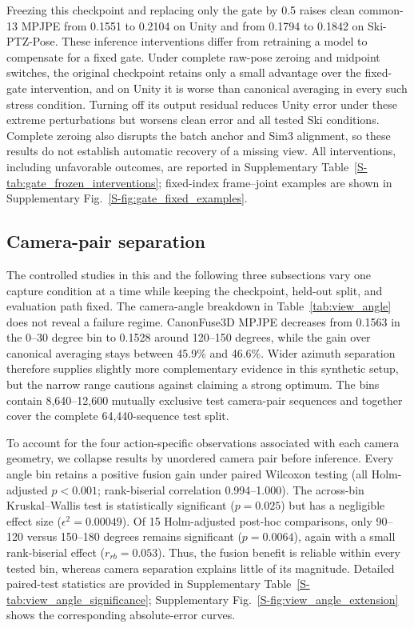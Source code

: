 \documentclass[preprint,12pt]{elsarticle}
\begin{document}
Freezing this checkpoint and replacing only the gate by 0.5 raises clean common-13 MPJPE from 0.1551 to 0.2104 on Unity and from 0.1794 to 0.1842 on Ski-PTZ-Pose. These inference interventions differ from retraining a model to compensate for a fixed gate. Under complete raw-pose zeroing and midpoint switches, the original checkpoint retains only a small advantage over the fixed-gate intervention, and on Unity it is worse than canonical averaging in every such stress condition. Turning off its output residual reduces Unity error under these extreme perturbations but worsens clean error and all tested Ski conditions. Complete zeroing also disrupts the batch anchor and Sim3 alignment, so these results do not establish automatic recovery of a missing view. All interventions, including unfavorable outcomes, are reported in Supplementary Table~\ref{S-tab:gate_frozen_interventions}; fixed-index frame--joint examples are shown in Supplementary Fig.~\ref{S-fig:gate_fixed_examples}.

\FloatBarrier
\subsection{Camera-pair separation}

The controlled studies in this and the following three subsections vary one capture condition at a time while keeping the checkpoint, held-out split, and evaluation path fixed. The camera-angle breakdown in Table~\ref{tab:view_angle} does not reveal a failure regime. CanonFuse3D MPJPE decreases from 0.1563 in the 0--30 degree bin to 0.1528 around 120--150 degrees, while the gain over canonical averaging stays between 45.9\% and 46.6\%. Wider azimuth separation therefore supplies slightly more complementary evidence in this synthetic setup, but the narrow range cautions against claiming a strong optimum. The bins contain 8,640--12,600 mutually exclusive test camera-pair sequences and together cover the complete 64,440-sequence test split.



To account for the four action-specific observations associated with each camera geometry, we collapse results by unordered camera pair before inference. Every angle bin retains a positive fusion gain under paired Wilcoxon testing (all Holm-adjusted \(p<0.001\); rank-biserial correlation 0.994--1.000). The across-bin Kruskal--Wallis test is statistically significant (\(p=0.025\)) but has a negligible effect size (\(\epsilon^2=0.00049\)). Of 15 Holm-adjusted post-hoc comparisons, only 90--120 versus 150--180 degrees remains significant (\(p=0.0064\)), again with a small rank-biserial effect (\(r_{rb}=0.053\)). Thus, the fusion benefit is reliable within every tested bin, whereas camera separation explains little of its magnitude. Detailed paired-test statistics are provided in Supplementary Table~\ref{S-tab:view_angle_significance}; Supplementary Fig.~\ref{S-fig:view_angle_extension} shows the corresponding absolute-error curves.
\end{document}
